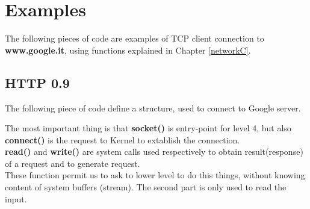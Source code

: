 \vspace{10cm}
\section{Examples}
The following pieces of code are examples of TCP client connection to \textbf{www.google.it}, using functions explained in Chapter \ref{networkC}.
\subsection{HTTP 0.9}
The following piece of code define a structure, used to connect to Google server. 


The most important thing is that \textbf{socket()} is entry-point for level 4, but also \textbf{connect()} is the request to Kernel to extablish the connection.\\ \textbf{read()} and \textbf{write()} are system calls used respectively to obtain result(response) of a request and to generate request.\\ These function permit us to ask to lower level to do this things, without knowing content of system buffers (stream). The second part is only used to read the input.

